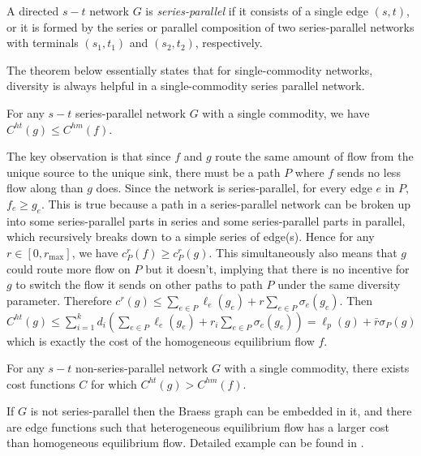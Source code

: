 \begin{definition}
A directed $s-t$ network $G$ is {\it series-parallel} if it consists of a single edge $(s, t)$, or it is formed by the series or parallel composition of two series-parallel networks with terminals $(s_1, t_1)$ and $(s_2, t_2)$, respectively.
\end{definition}

The theorem below essentially states that for single-commodity networks, diversity is always helpful in a single-commodity series parallel network.

\begin{theorem}
For any $s-t$ series-parallel network $G$ with a single commodity, we have $C^{ht}(g)\le C^{hm}(f)$.
\label{diverse1}
\end{theorem}

\begin{proof-sketch}

The key observation is that since $f$ and $g$ route the same amount of flow from the unique source to the unique sink, there must be a path $P$ where $f$ sends no less flow along than $g$ does. Since the network is series-parallel, for every edge $e$ in $P$, $f_e \ge g_e$. This is true because a path in a series-parallel network can be broken up into some series-parallel parts in series and some series-parallel parts in parallel, which recursively breaks down to a simple series of edge(s). Hence for any $r\in [0, r_{\max}]$, we have $c_P^r(f)\ge c_P^r(g)$. This simultaneously also means that $g$ could route more flow on $P$ but it doesn't, implying that there is no incentive for $g$ to switch the flow it sends on other paths to path $P$ under the same diversity parameter. Therefore $c^r(g)\le \sum_{e\in P} \ell_e(g_e)+r\sum_{e\in P}\sigma_e(g_e)$. Then $C^{ht}(g)\le \sum_{i=1}^k d_i(\sum_{e\in P} \ell_e(g_e)+r_i\sum_{e\in P}\sigma_e(g_e))=\ell_p(g)+\bar{r}\sigma_P(g)$ which is exactly the cost of the homogeneous equilibrium flow $f$.
\end{proof-sketch}


\begin{theorem}
For any $s-t$ non-series-parallel network $G$ with a single commodity, there exists cost functions $C$ for which $C^{ht}(g)> C^{hm}(f)$.
\label{diversethm2}
\end{theorem}

\begin{proof-sketch}
If $G$ is not series-parallel then the Braess graph can be embedded in it, and there are edge functions such that heterogeneous equilibrium flow has a larger cost than homogeneous equilibrium flow. Detailed example can be found in \cite{??}.

\end{proof-sketch}

